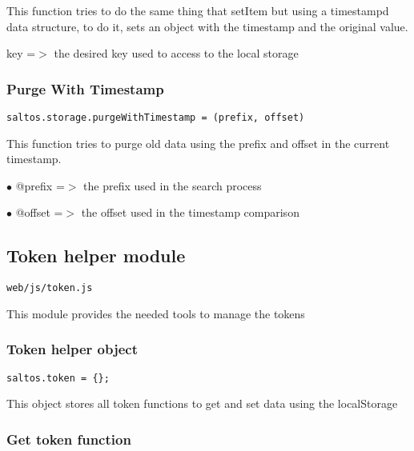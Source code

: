 \documentclass[a4paper]{article}
\begin{document}
This function tries to do the same thing that setItem but using a timestampd data
structure, to do it, sets an object with the timestamp and the original value.

key =$>$ the desired key used to access to the local storage

\hypertarget{toc854}{}
\subsubsection{Purge With Timestamp}

\begin{lstlisting}
saltos.storage.purgeWithTimestamp = (prefix, offset)
\end{lstlisting}

This function tries to purge old data using the prefix and offset in the current
timestamp.

\begin{compactitem}
\item[\color{myblue}$\bullet$] @prefix =$>$ the prefix used in the search process
\item[\color{myblue}$\bullet$] @offset =$>$ the offset used in the timestamp comparison
\end{compactitem}

\hypertarget{toc855}{}
\subsection{Token helper module}

\begin{lstlisting}
web/js/token.js
\end{lstlisting}

This module provides the needed tools to manage the tokens

\hypertarget{toc856}{}
\subsubsection{Token helper object}

\begin{lstlisting}
saltos.token = {};
\end{lstlisting}

This object stores all token functions to get and set data using the localStorage

\hypertarget{toc857}{}
\subsubsection{Get token function}
\end{document}
